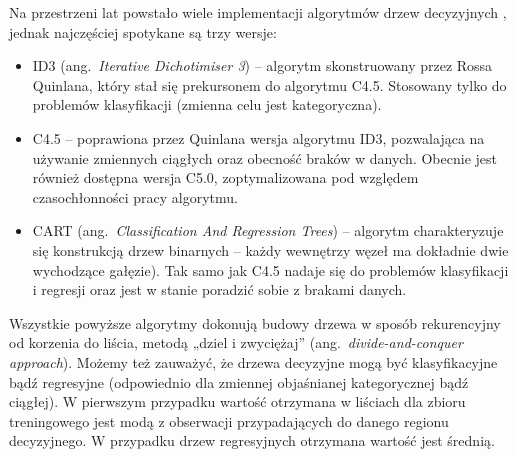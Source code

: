 \documentclass[12pt,a4paper,twoside,openany]{book}
\begin{document}
Na przestrzeni lat powstało wiele implementacji algorytmów drzew decyzyjnych \citep[][]{kass1980,loh1997,kim2001}, jednak najczęściej spotykane są trzy wersje: 
\begin{itemize}
\item ID3 (ang.~\textit{Iterative Dichotimiser 3}) – algorytm skonstruowany przez Rossa Quinlana, który stał się prekursonem do algorytmu C4.5. Stosowany tylko do problemów klasyfikacji (zmienna celu jest kategoryczna).
\item C4.5 – poprawiona przez Quinlana wersja algorytmu ID3, pozwalająca na używanie zmiennych ciągłych oraz obecność braków w danych. Obecnie jest również dostępna wersja C5.0, zoptymalizowana pod względem czasochłonności pracy algorytmu.
\item CART (ang.~\textit{Classification And Regression Trees}) – algorytm charakteryzuje się konstrukcją drzew binarnych – każdy wewnętrzy węzeł ma dokładnie dwie wychodzące gałęzie). Tak samo jak C4.5 nadaje się do problemów klasyfikacji i regresji oraz jest w stanie poradzić sobie z brakami danych.
\end{itemize}

Wszystkie powyższe algorytmy dokonują budowy drzewa w sposób rekurencyjny od korzenia do liścia, metodą „dziel i zwyciężaj” (ang.~\textit{divide-and-conquer approach}).  Możemy też zauważyć, że drzewa decyzyjne mogą być klasyfikacyjne bądź regresyjne (odpowiednio dla zmiennej objaśnianej kategorycznej bądź ciągłej). W pierwszym przypadku wartość otrzymana w liściach dla zbioru treningowego jest modą z obserwacji przypadających do danego regionu decyzyjnego. W przypadku drzew regresyjnych otrzymana wartość jest średnią.
\end{document}

